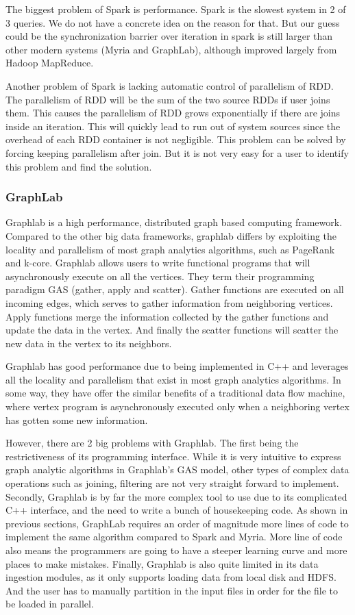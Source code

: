 The biggest problem of Spark is performance. Spark is the slowest system in 2 
of 3 queries. We do not have a concrete idea on the reason for that. But our 
guess could be the synchronization barrier over iteration in spark is still 
larger than other modern systems (Myria and GraphLab), although improved 
largely from Hadoop MapReduce.

Another problem of Spark is lacking automatic control of parallelism of RDD. 
The parallelism of RDD will be the sum of the two source RDDs if user joins
them. This causes the parallelism of RDD grows exponentially if there are
joins inside an iteration. This will quickly lead to run out of system 
sources since the overhead of each RDD container is not negligible. This 
problem can be solved by forcing keeping parallelism after join. But it is
not very easy for a user to identify this problem and find the solution.   
    
\subsubsection{GraphLab}

Graphlab is a high performance, distributed graph based computing framework. Compared to the other big data frameworks, graphlab differs by exploiting the locality and parallelism of most graph analytics algorithms, such as PageRank and k-core. Graphlab allows users to write functional programs that will asynchronously execute on all the vertices. They term their programming paradigm GAS (gather, apply and scatter). Gather functions are executed on all incoming edges, which serves to gather information from neighboring vertices. Apply functions merge the information collected by the gather functions and update the data in the vertex. And finally the scatter functions will scatter the new data in the vertex to its neighbors.

Graphlab has good performance due to being implemented in C++ and leverages all the locality and parallelism that exist in most graph analytics algorithms. In some way, they have offer the similar benefits of a traditional data flow machine, where vertex program is asynchronously executed only when a neighboring vertex has gotten some new information.

However, there are 2 big problems with Graphlab. The first being the restrictiveness of its programming interface. While it is very intuitive to express graph analytic algorithms in Graphlab's GAS model, other types of complex data operations such as joining, filtering are not very straight forward to implement. Secondly, Graphlab is by far the more complex tool to use due to its complicated C++ interface, and the need to write a bunch of housekeeping code. As shown in previous sections, GraphLab requires an order of magnitude more lines of code to implement the same algorithm compared to Spark and Myria. More line of code also means the programmers are going to have a steeper learning curve and more places to make mistakes. Finally, Graphlab is also quite limited in its data ingestion modules, as it only supports loading data from local disk and HDFS. And the user has to manually partition in the input files in order for the file to be loaded in parallel.



